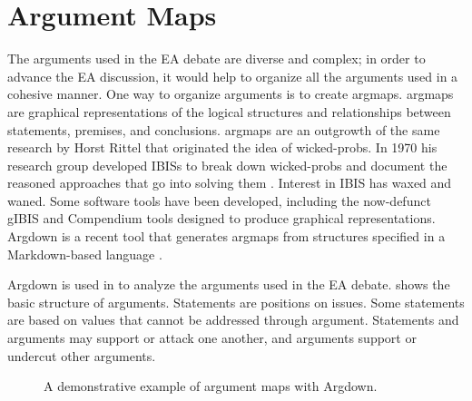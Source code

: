\propsend

\section{Argument Maps}
\label{sec-arg-maps-intro}

The arguments used in the \ac{EA} debate are diverse and complex; in order to advance the \ac{EA} discussion, it would
help to organize all the arguments used in a cohesive manner. One way to organize arguments is to create \acp{argmap}.
\Acp{argmap} are graphical representations of the logical structures and relationships between statements, premises, and
conclusions. \Acp{argmap} are an outgrowth of the same research by Horst Rittel that originated the idea of
\acp{wicked-prob}. In 1970 his research group developed \acp{IBIS} to break down \acp{wicked-prob} and document the
reasoned approaches that go into solving them \cite{kunz_issues_1970}. Interest in \ac{IBIS} has waxed and waned. Some
software tools have been developed, including the now-defunct gIBIS \cite{conklin_gibis_1988} and Compendium
\cite{dutoit_hypermedia_2006} tools designed to produce graphical representations. Argdown is a recent tool that
generates \acp{argmap} from structures specified in a Markdown-based language \cite{voigt_argdown_2018}.

Argdown is used in  to analyze the arguments used in the \ac{EA} debate. 
shows the basic structure of arguments. Statements are positions on issues. Some statements are based on values that
cannot be addressed through argument. Statements and arguments may support or attack one another, and arguments support
or undercut other arguments.

\begin{figure}[ht]
    \centering\CaptionFontSize
    \caption[Argdown Demo]{A demonstrative example of argument maps with Argdown.}
    \label{fig-args-demo}
\end{figure}

